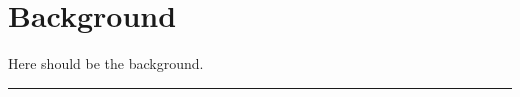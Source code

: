 \chapter{Background}\label{sec-background}

Here should be the background.

\noindent\rule{8cm}{0.4pt}


\newpage
